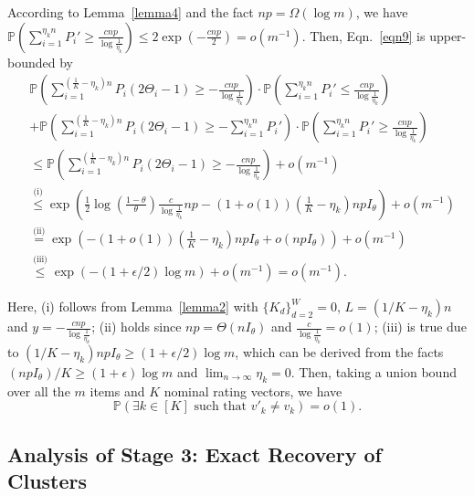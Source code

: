 \documentclass{article}
\begin{document}
According to Lemma~\ref{lemma4} and the fact $np=\Omega(\log m)$,  we have $\mathbb{P}\left( \sum_{i=1}^{\eta_k n} P_i' \geq \frac{cnp}{\log \frac{1}{\eta_k}} \right) \leq 2 \exp \left( -\frac{cnp}{2} \right)  = o(m^{-1})$. Then, Eqn.~\eqref{eqn9} is upper-bounded by
\begin{align*}
    & \mathbb{P} \left( \sum_{i=1}^{(\frac{1}{K} - \eta_k)n} P_i(2\Theta_i - 1) \geq -\frac{cnp}{\log \frac{1}{\eta_k}} \right) \cdot \mathbb{P}\left( \sum_{i=1}^{\eta_k n} P_i' \leq \frac{cnp}{\log \frac{1}{\eta_k}} \right) \\
    & + \mathbb{P} \left( \sum_{i=1}^{(\frac{1}{K} - \eta_k)n} P_i(2\Theta_i - 1) \geq -\sum_{i=1}^{\eta_k n} P_i' \right) \cdot \mathbb{P}\left( \sum_{i=1}^{\eta_k n} P_i' \geq \frac{cnp}{\log \frac{1}{\eta_k}} \right) \\
    & \leq \mathbb{P} \left( \sum_{i=1}^{(\frac{1}{K} - \eta_k)n} P_i(2\Theta_i - 1) \geq -\frac{cnp}{\log \frac{1}{\eta_k}} \right) + o(m^{-1}) \\
    & \overset{\text{(i)}}{\leq} \exp \left( \frac{1}{2} \log \left( \frac{1-\theta}{\theta} \right) \frac{c}{\log \frac{1}{\eta_k}} n p - (1+o(1)) \left( \frac{1}{K} - \eta_k  \right) n p I_\theta \right) + o(m^{-1}) \\
    & \overset{\text{(ii)}}{=} \exp \left( - (1+o(1)) \left( \frac{1}{K} - \eta_k \right) n p I_\theta + o(n p I_\theta) \right) + o(m^{-1}) \\
    & \overset{\text{(iii)}}{\leq} \exp \left( -(1+ \epsilon/2) \log m \right) +o(m^{-1}) = o(m^{-1}).
\end{align*}

Here, (i) follows from Lemma~\ref{lemma2} with $\{K_d\}_{d=2}^W = 0$, $L=(1/K - \eta_k)n$ and $y = -\frac{cnp}{\log \frac{1}{\eta_k}}$; (ii) holds since $np=\Theta(n I_\theta)$ and $\frac{c}{\log \frac{1}{\eta_k}} = o(1)$; (iii) is true due to $(1/K-\eta_k)n p I_\theta \geq (1+\epsilon/2)\log m$, which can be derived from the facts $(n p I_\theta)/K \geq (1+\epsilon) \log m$ and $\lim_{n \rightarrow \infty} \eta_k = 0$. Then, taking a union bound over all the $m$ items  and $K$ nominal rating vectors, we have $$\mathbb{P}(\exists k \in [K] \text{\ such that \ } v'_k \neq v_k ) = o(1).$$


\subsection{Analysis of Stage 3: Exact Recovery of Clusters}
\end{document}
